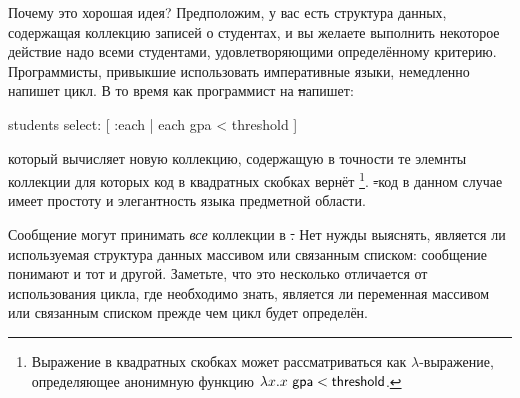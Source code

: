 \documentclass[a4paper,10pt,twoside]{book}
\begin{document}
Почему это хорошая идея?
Предположим, у вас есть структура данных, содержащая коллекцию записей о студентах, и вы желаете выполнить некоторое действие надо всеми студентами, удовлетворяющими определённому критерию. Программисты, привыкшие использовать императивные языки, немедленно напишет цикл. В то время как программист на \st напишет:
\begin{code}{}
students select: [ :each | each gpa < threshold ]
\end{code}
\noindent
который вычисляет новую коллекцию, содержащую в точности те элемнты коллекции  для которых код в квадратных скобках вернёт \footnote{Выражение в квадратных скобках может рассматриваться как $\lambda$-выражение, определяющее анонимную функцию $\lambda x. x~{\sf gpa} < {\sf threshold}$.
}.
\st-код в данном случае имеет простоту и элегантность языка предметной области.

Сообщение  могут принимать \emph{все} коллекции в \st. Нет нужды выяснять, является ли используемая структура данных массивом или связанным списком: сообщение  понимают и тот и другой. Заметьте, что это несколько отличается от использования цикла, где необходимо знать, является ли переменная  массивом или связанным списком прежде чем цикл будет определён.
\end{document}
